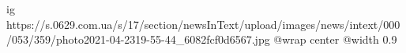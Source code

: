  
 
 
 
 

\ifcmt
  ig https://s.0629.com.ua/s/17/section/newsInText/upload/images/news/intext/000/053/359/photo2021-04-2319-55-44_6082fcf0d6567.jpg
  @wrap center
  @width 0.9
\fi
